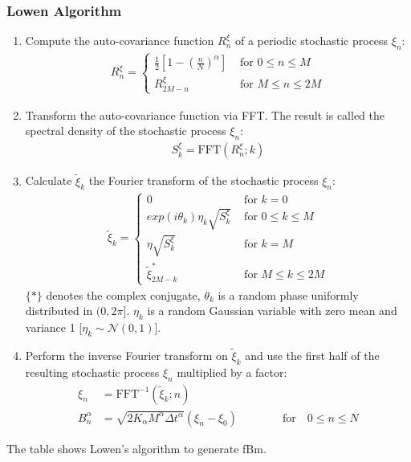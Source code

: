 \documentclass[
  a4paper,BCOR10mm,oneside,
  headsepline,footsepline,%
  fleqn,openbib
]{scrbook}
\begin{document}
\subsubsection{Lowen Algorithm}
\begin{table}[h]
 \begin{framed}
\begin{enumerate}
 \item Compute the auto-covariance function $R^{\xi}_n$ of a periodic stochastic process $\xi_n$:
 \begin{align}
  R^{\xi}_n=
  \begin{cases}
   \frac{1}{2}\left[1-\left(\frac{n}{N}\right)^{\alpha} \right]  & \text{ for    } 0 \leq n \leq M \\
   R^{\xi}_{2M-n}  & \text{ for    } M \leq n \leq 2M 
  \end{cases}
 \end{align}
 \item Transform the auto-covariance function via FFT. The result is called the spectral density of the stochastic process $\xi_n$:
  \begin{align}
   S^{\xi}_k= \mathrm{FFT}(R^{\xi}_n;k)
  \end{align}
 \item Calculate $\tilde\xi_k$ the Fourier transform of the stochastic process $\xi_n$:
 \begin{align}
  \tilde\xi_k=
  \begin{cases}
     0  & \text{ for    } k=0 \\    
     exp(i \theta_k) \eta_k \sqrt{S^{\xi}_k}  & \text{ for    } 0 \leq k \leq M \\
     \eta \sqrt{S^{\xi}_k}  & \text{ for    } k = M \\
     \tilde\xi^{*}_{2M-k} & \text{ for    } M \leq k \leq 2M 
  \end{cases}
 \end{align}
 $\{*\}$ denotes the complex conjugate, $\theta_k$ is a random phase uniformly distributed  in $(0,2\pi]$. $\eta_k$ is a random Gaussian variable with zero mean and variance 1 [$\eta_k\sim \mathcal{N}(0,1)$].  
 \item Perform the inverse Fourier transform on $\tilde\xi_k$ and use the first half of the resulting stochastic process $\xi_n$ multiplied by a factor:
 \begin{align}
  \xi_n&=\mathrm{FFT}^{-1}(\tilde\xi_k;n) \\
  B^{\alpha}_n&=  \sqrt{2 K_{\alpha} M^{\alpha} \Delta t^{\alpha}} (\xi_n- \xi_0)  \qquad \qquad \text{for} \quad 0 \leq n \leq N
 \end{align}
\end{enumerate}
\end{framed}
\label{Lowenalgorithm}
\caption{The table shows Lowen's algorithm \cite{Lowen1999} to generate fBm.}
 \end{table}
 
\end{document}

